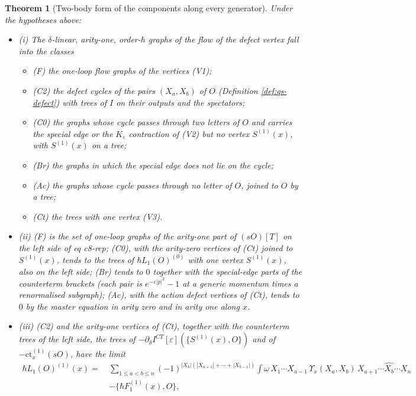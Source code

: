 \documentclass[11pt]{article}
\numberwithin{equation}{section}
\theoremstyle{plain}
\newtheorem{theorem}{Theorem}[section]
\theoremstyle{definition}
\begin{document}
\begin{theorem}[Two-body form of the components along every generator]
\label{thm:qs-classes}
Under the hypotheses above:
\begin{itemize}
\item (i) The $\delta$-linear, arity-one, order-$\hbar$ graphs of the flow of the defect vertex fall into the classes
\begin{itemize}
\item (F) the one-loop flow graphs of the vertices (V1);
\item (C2) the defect cycles of the pairs $(X_a,X_b)$ of $O$ (Definition \ref{def:qs-defect}) with trees of $I$ on their outputs and the spectators;
\item (C0) the graphs whose cycle passes through two letters of $O$ and carries the special edge or the $K_\varepsilon$ contraction of (V2) but no vertex $S^{(1)}(x)$, with $S^{(1)}(x)$ on a tree;
\item (Br) the graphs in which the special edge does not lie on the cycle;
\item (Ac) the graphs whose cycle passes through no letter of $O$, joined to $O$ by a tree;
\item (Ct) the trees with one vertex (V3).
\end{itemize}
\item (ii) (F) is the set of one-loop graphs of the arity-one part of $(sO)[T]$ on the left side of eq c8-rep; (C0), with the arity-zero vertices of (Ct) joined to $S^{(1)}(x)$, tends to the trees of $\hbar L_1(O)^{(0)}$ with one vertex $S^{(1)}(x)$, also on the left side; (Br) tends to $0$ together with the special-edge parts of the counterterm brackets (each pair is $e^{-\varepsilon|p|^2}-1$ at a generic momentum times a renormalised subgraph); (Ac), with the action defect vertices of (Ct), tends to $0$ by the master equation in arity zero and in arity one along $x$.
\item (iii) (C2) and the arity-one vertices of (Ct), together with the counterterm trees of the left side, the trees of $-\partial_\delta I^{CT}[\varepsilon](\{S^{(1)}(x),O\})$ and of $-\mathrm{ct}^{(1)}_x(sO)$, have the limit
\begin{equation}
\begin{aligned}
\hbar L_1(O)^{(1)}(x)=\ &\sum_{1\le a<b\le n}(-1)^{|X_b|(|X_{a+1}|+\cdots+|X_{b-1}|)}\int\omega\,X_1\cdots X_{a-1}\,\Upsilon_x(X_a,X_b)\,X_{a+1}\cdots\widehat{X_b}\cdots X_n\\
&-\big\{\hbar F_1^{(1)}(x),O\big\},
\end{aligned}

\end{equation}
\end{itemize}
\end{theorem}
\end{document}
